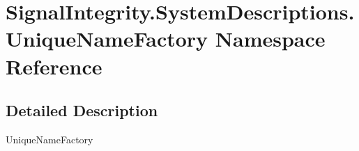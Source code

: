 \hypertarget{namespaceSignalIntegrity_1_1SystemDescriptions_1_1UniqueNameFactory}{}\section{Signal\+Integrity.\+System\+Descriptions.\+Unique\+Name\+Factory Namespace Reference}
\label{namespaceSignalIntegrity_1_1SystemDescriptions_1_1UniqueNameFactory}


\subsection{Detailed Description}
\begin{DoxyVerb}UniqueNameFactory\end{DoxyVerb}
 